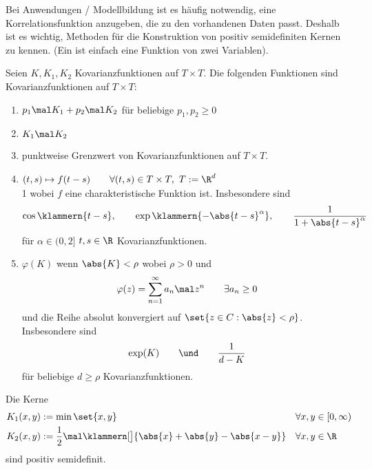 Bei Anwendungen / Modellbildung ist es häufig notwendig, eine Korrelationsfunktion anzugeben, die zu den vorhandenen Daten passt.
Deshalb ist es wichtig, Methoden für die Konstruktion von positiv semidefiniten Kernen zu kennen.
(Ein  ist einfach eine Funktion von zwei Variablen).

\begin{aufgabenr}\label{aufg:19}\enter
	Seien $K,K_1,K_2$ Kovarianzfunktionen auf $T\times T$.
	Die folgenden Funktionen sind Kovarianzfunktionen auf $T\times T$:
	\begin{enumerate}[label=(\roman*)]
		\item $\begin{aligned}
			p_1\mal K_1+p_2\mal K_2
		\end{aligned}$ für beliebige $p_1,p_2\geq0$
		\label{item:aufg19_i}
		\item $K_1\mal K_2$
		\label{item:aufg19_ii}
		\item punktweise Grenzwert von Kovarianzfunktionen auf $T\times T$.
		\label{item:aufg19_iii}
		\item $\begin{aligned}
			(t,s)\mapsto f(t-s)\qquad\forall (t,s)\in T\times T,~T:=\R^d
		\end{aligned}$\\1
		wobei $f$ eine charakteristische Funktion ist.
		Insbesondere sind
		\begin{align*}
			\cos\klammern{t-s},\qquad\exp\klammern{-\abs{t-s}^\alpha},\qquad
			\frac{1}{1+\abs{t-s}^\alpha}
		\end{align*}
		für $\alpha\in(0,2]$ $t,s\in\R$ Kovarianzfunktionen.
		\label{item:aufg19_iv}
		\item $\varphi(K)$ wenn $\abs{K}<\rho$ wobei $\rho>0$ und 
		\begin{align*}
			\varphi(z)=\sum\limits_{n=1}^\infty a_n\mal z^n\qquad\exists a_n\geq 0
		\end{align*}
		und die Reihe absolut konvergiert auf $\set{z\in C:\abs{z}<\rho}$.
		Insbesondere sind 
		\begin{align*}
			\exp(K)
			\qquad\und\qquad
			\frac{1}{d-K}
		\end{align*}
		für beliebige $d\geq \rho$ Kovarianzfunktionen.
		\label{item:aufg19_v}
	\end{enumerate}
\end{aufgabenr}

\begin{lemma}\label{lemma3.1.6}
	Die Kerne
	\begin{align*}
		K_1(x,y)&:=\min\set{x,y} &&\forall x,y\in [0,\infty)\\
		K_2(x,y)&:=\frac{1}{2}\mal\klammern[\big]{\abs{x}+\abs{y}-\abs{x-y}} &&\forall x,y\in\R
	\end{align*}
	sind positiv semidefinit.
\end{lemma}

